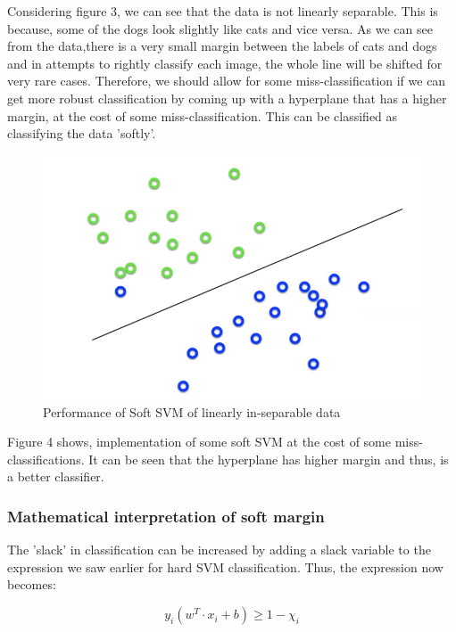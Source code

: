 \documentclass[11pt]{article}
\begin{document}
Considering figure 3, we can see that the data is not linearly separable.  This is because, some of the dogs look slightly like cats and vice versa. As we can see from the data,there is a very small margin between the labels of cats and dogs and in attempts to rightly classify each image, the whole line will be shifted for very rare cases. Therefore, we should allow for some miss-classification if we can get more robust classification by coming up with a hyperplane that has a higher margin, at the cost of some miss-classification. This can be classified as classifying the data 'softly'.

\begin{figure}[H]
\begin{center}
\includegraphics[scale=0.25]{figures/SoftSVM.png}
\end{center}
\caption{Performance of Soft SVM of linearly in-separable data}
\label{fig:LinearlySeperable}
\end{figure}

Figure 4 shows, implementation of some soft SVM at the cost of some miss-classifications. It can be seen that the hyperplane has higher margin and thus, is a better classifier.

\subsubsection{Mathematical interpretation of soft margin}

The 'slack' in classification can be increased by adding a slack variable to the expression we saw earlier for hard SVM classification. Thus, the expression now becomes:

\begin{equation}
y_i(w^T \cdot x_i+b) \geq 1- \chi_i
\end{equation}
\end{document}
